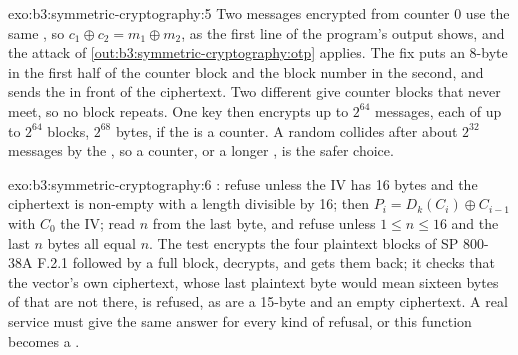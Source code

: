\begin{solution}{exo:b3:symmetric-cryptography:5}
Two messages encrypted from counter 0 use the same , so $c_1 \oplus c_2 = m_1 \oplus m_2$, as the first line of the program's output shows, and the attack of \cref{out:b3:symmetric-cryptography:otp} applies. The fix puts an 8-byte  in the first half of the counter block and the block number in the second, and sends the  in front of the ciphertext. Two different  give counter blocks that never meet, so no  block repeats. One key then encrypts up to $2^{64}$ messages, each of up to $2^{64}$ blocks, $2^{68}$ bytes, if the  is a counter. A random  collides after about $2^{32}$ messages by the , so a counter, or a longer , is the safer choice.
\end{solution}

\begin{solution}{exo:b3:symmetric-cryptography:6}
: refuse unless the IV has 16 bytes and the ciphertext is non-empty with a length divisible by 16; then $P_i = D_k(C_i) \oplus C_{i-1}$ with $C_0$ the IV; read $n$ from the last byte, and refuse unless $1 \le n \le 16$ and the last $n$ bytes all equal $n$. The test encrypts the four plaintext blocks of SP 800-38A F.2.1 followed by a full  block, decrypts, and gets them back; it checks that the vector's own ciphertext, whose last plaintext byte  would mean sixteen bytes of  that are not there, is refused, as are a 15-byte and an empty ciphertext. A real service must give the same answer for every kind of refusal, or this function becomes a .
\end{solution}

